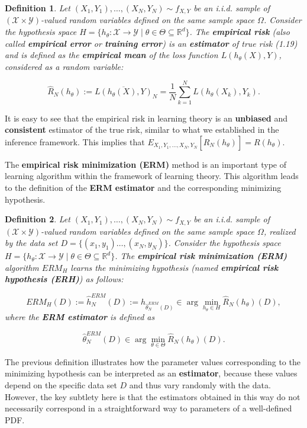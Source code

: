 \documentclass{report}
\newtheorem{definition}{Definition}[chapter]
\begin{document}
\begin{definition}
Let $(X_1, Y_1),\dots,(X_N, Y_N) \sim f_{X,Y}$ be an i.i.d. sample of $(\mathcal{X} \times \mathcal{Y})$-valued random variables defined on the same sample space $\Omega$. Consider the hypothesis space $H=\{h_\theta : \mathcal{X} \to \mathcal{Y} \mid\theta\in\Theta\subseteq\mathbb{R}^d\}$. The \textbf{empirical risk} (also called \textbf{empirical error} or \textbf{training error}) is an \textbf{estimator} of true risk (1.19) and is defined as the \textbf{empirical mean} of the loss function $L(h_\theta(X), Y)$, considered as a random variable:

\begin{equation}
\hat{R}_N(h_\theta) := \overline{L(h_\theta(X),Y)}_N = \frac{1}{N}\sum_{k=1}^{N}L(h_\theta(X_k),Y_k).
\end{equation}
\end{definition}
It is easy to see that the empirical risk in learning theory is an \textbf{unbiased} and \textbf{consistent} estimator of the true risk, similar to what we established in the inference framework. This implies that $E_{X_1,Y_1,\dots,X_N,Y_N}[\hat{R}_N(h_\theta)] =  R(h_\theta)$.

The \textbf{empirical risk minimization (ERM)} method is an important type of learning algorithm within the framework of learning theory. This algorithm leads to the definition of the \textbf{ERM estimator} and the corresponding minimizing hypothesis.

\begin{definition}
Let $(X_1, Y_1),\dots,(X_N, Y_N) \sim f_{X,Y}$ be an i.i.d. sample of $(\mathcal{X} \times \mathcal{Y})$-valued random variables defined on the same sample space $\Omega$, realized by the data set $D =\{(x_1, y_1)\dots,(x_N,y_N)\}$. Consider the hypothesis space $H = \{h_\theta : \mathcal{X} \to \mathcal{Y} \mid\theta\in\Theta\subseteq\mathbb{R}^d\}$. The \textbf{empirical risk minimization (ERM)} algorithm $ERM_H$ learns the minimizing hypothesis (named \textbf{empirical risk hypothesis (ERH)}) as follows:

\begin{equation}
ERM_H(D) := \hat{h}_N^{ERM}(D) := h_{\hat{\theta}^{ERM}_N(D)} \in \arg \min_{h_\theta \in H} \hat{R}_N(h_\theta)(D),
\end{equation}
where the \textbf{ERM estimator} is defined as

\begin{equation}
\hat{\theta}^{ERM}_N(D) \in \arg\min_{\theta \in \Theta}\hat{R}_N(h_\theta)(D).
\end{equation}
\end{definition}
The previous definition illustrates how the parameter values corresponding to the minimizing hypothesis can be interpreted as an \textbf{estimator}, because these values depend on the specific data set $D$ and thus vary randomly with the data. However, the key subtlety here is that the estimators obtained in this way do not necessarily correspond in a straightforward way to parameters of a well-defined PDF.
\end{document}

